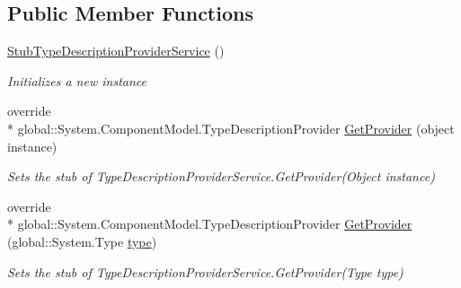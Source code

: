\subsection*{Public Member Functions}
\begin{DoxyCompactItemize}
\item 
\hyperlink{class_system_1_1_component_model_1_1_design_1_1_fakes_1_1_stub_type_description_provider_service_aeeadb5d226f958354dd6a3c8e16c0e71}{Stub\-Type\-Description\-Provider\-Service} ()
\begin{DoxyCompactList}\small\item\em Initializes a new instance\end{DoxyCompactList}\item 
override \\*
global\-::\-System.\-Component\-Model.\-Type\-Description\-Provider \hyperlink{class_system_1_1_component_model_1_1_design_1_1_fakes_1_1_stub_type_description_provider_service_ac5d1557504da63aa2ca4beb1fd51ae26}{Get\-Provider} (object instance)
\begin{DoxyCompactList}\small\item\em Sets the stub of Type\-Description\-Provider\-Service.\-Get\-Provider(\-Object instance)\end{DoxyCompactList}\item 
override \\*
global\-::\-System.\-Component\-Model.\-Type\-Description\-Provider \hyperlink{class_system_1_1_component_model_1_1_design_1_1_fakes_1_1_stub_type_description_provider_service_a852885450585ab5835ade48ea69915fa}{Get\-Provider} (global\-::\-System.\-Type \hyperlink{jquery-1_810_82-vsdoc_8js_a3940565e83a9bfd10d95ffd27536da91}{type})
\begin{DoxyCompactList}\small\item\em Sets the stub of Type\-Description\-Provider\-Service.\-Get\-Provider(\-Type type)\end{DoxyCompactList}\end{DoxyCompactItemize}
